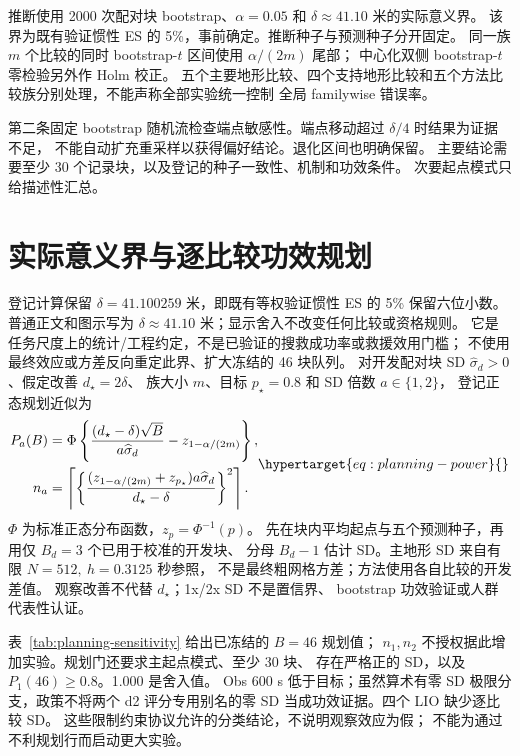 推断使用 2000 次配对块 bootstrap、\(\alpha=0.05\) 和 \(\delta\approx41.10\) 米的实际意义界。
该界为既有验证惯性 ES 的 5\%，事前确定。推断种子与预测种子分开固定。
同一族 \(m\) 个比较的同时 bootstrap-\(t\) 区间使用 \(\alpha/(2m)\) 尾部；
中心化双侧 bootstrap-\(t\) 零检验另外作 Holm 校正。
五个主要地形比较、四个支持地形比较和五个方法比较族分别处理，不能声称全部实验统一控制
全局 familywise 错误率。

第二条固定 bootstrap 随机流检查端点敏感性。端点移动超过 \(\delta/4\) 时结果为证据不足，
不能自动扩充重采样以获得偏好结论。退化区间也明确保留。
主要结论需要至少 30 个记录块，以及登记的种子一致性、机制和功效条件。
次要起点模式只给描述性汇总。


\section{实际意义界与逐比较功效规划}
\label{sec:planning-qualification}\hypertarget{sec:planning-qualification}{}
登记计算保留 \(\delta=41.100259\) 米，即既有等权验证惯性 ES 的 5\% 保留六位小数。
普通正文和图示写为 \(\delta\approx41.10\) 米；显示舍入不改变任何比较或资格规则。
它是任务尺度上的统计/工程约定，不是已验证的搜救成功率或救援效用门槛；
不使用最终效应或方差反向重定此界、扩大冻结的 46 块队列。
对开发配对块 SD \(\widehat\sigma_d>0\)、假定改善 \(d_\star=2\delta\)、
族大小 \(m\)、目标 \(p_\star=0.8\) 和 SD 倍数 \(a\in\{1,2\}\)，
登记正态规划近似为
\begin{equation}
\begin{aligned}
 P_a(B)&=\Phi\left\{\frac{(d_\star-\delta)\sqrt B}{a\widehat\sigma_d}
                         -z_{1-\alpha/(2m)}\right\},\\
 n_a&=\left\lceil\left\{\frac{(z_{1-\alpha/(2m)}+z_{p_\star})a\widehat\sigma_d}
                              {d_\star-\delta}\right\}^{2}\right\rceil .
\end{aligned}
\label{eq:planning-power}\hypertarget{eq:planning-power}{}
\end{equation}
\(\Phi\) 为标准正态分布函数，\(z_p=\Phi^{-1}(p)\)。
先在块内平均起点与五个预测种子，再用仅 \(B_d=3\) 个已用于校准的开发块、
分母 \(B_d-1\) 估计 SD。主地形 SD 来自有限 \(N=512,\ h=0.3125\) 秒参照，
不是最终粗网格方差；方法使用各自比较的开发差值。
观察改善不代替 \(d_\star\)；1x/2x SD 不是置信界、
bootstrap 功效验证或人群代表性认证。

表~\ref{tab:planning-sensitivity} 给出已冻结的 \(B=46\) 规划值；
\(n_1,n_2\) 不授权据此增加实验。规划门还要求主起点模式、至少 30 块、
存在严格正的 SD，以及 \(P_1(46)\geq0.8\)。1.000 是舍入值。
Obs 600 s 低于目标；虽然算术有零 SD 极限分支，政策不将两个 d2
评分专用别名的零 SD 当成功效证据。四个 LIO 缺少逐比较 SD。
这些限制约束协议允许的分类结论，不说明观察效应为假；
不能为通过不利规划行而启动更大实验。

